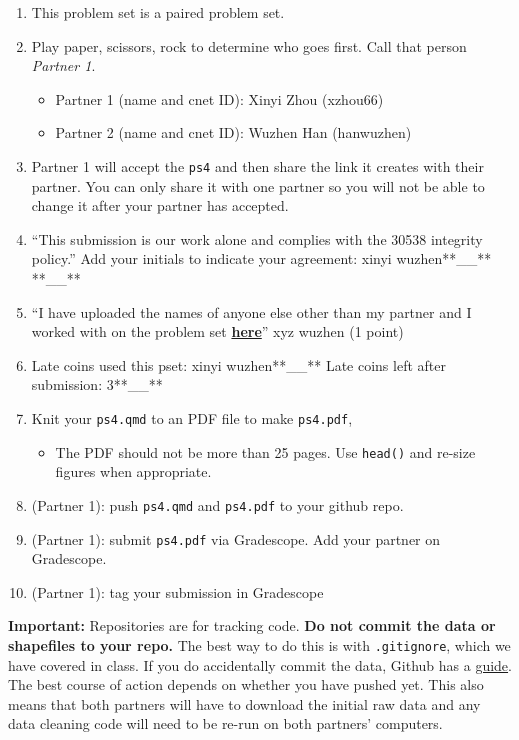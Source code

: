 \documentclass[
  letterpaper,
  DIV=11,
  numbers=noendperiod]{scrartcl}
\providecommand{\tightlist}{%
  \setlength{\itemsep}{0pt}\setlength{\parskip}{0pt}}\usepackage{longtable,booktabs,array}
\begin{document}
\begin{enumerate}
\def\labelenumi{\arabic{enumi}.}
\tightlist
\item
  This problem set is a paired problem set.
\item
  Play paper, scissors, rock to determine who goes first. Call that
  person \emph{Partner 1}.

  \begin{itemize}
  \tightlist
  \item
    Partner 1 (name and cnet ID): Xinyi Zhou (xzhou66)
  \item
    Partner 2 (name and cnet ID): Wuzhen Han (hanwuzhen)
  \end{itemize}
\item
  Partner 1 will accept the \texttt{ps4} and then share the link it
  creates with their partner. You can only share it with one partner so
  you will not be able to change it after your partner has accepted.
\item
  ``This submission is our work alone and complies with the 30538
  integrity policy.'' Add your initials to indicate your agreement:
  xinyi wuzhen**\_\_** **\_\_**
\item
  ``I have uploaded the names of anyone else other than my partner and I
  worked with on the problem set
  \textbf{\href{https://docs.google.com/forms/d/185usrCREQaUbvAXpWhChkjghdGgmAZXA3lPWpXLLsts/edit}{here}}''
  xyz wuzhen (1 point)
\item
  Late coins used this pset: xinyi wuzhen**\_\_** Late coins left after
  submission: 3**\_\_**
\item
  Knit your \texttt{ps4.qmd} to an PDF file to make \texttt{ps4.pdf},

  \begin{itemize}
  \tightlist
  \item
    The PDF should not be more than 25 pages. Use \texttt{head()} and
    re-size figures when appropriate.
  \end{itemize}
\item
  (Partner 1): push \texttt{ps4.qmd} and \texttt{ps4.pdf} to your github
  repo.
\item
  (Partner 1): submit \texttt{ps4.pdf} via Gradescope. Add your partner
  on Gradescope.
\item
  (Partner 1): tag your submission in Gradescope
\end{enumerate}

\textbf{Important:} Repositories are for tracking code. \textbf{Do not
commit the data or shapefiles to your repo.} The best way to do this is
with \texttt{.gitignore}, which we have covered in class. If you do
accidentally commit the data, Github has a
\href{https://docs.github.com/en/repositories/working-with-files/managing-large-files/about-large-files-on-github\#removing-files-from-a-repositorys-history}{guide}.
The best course of action depends on whether you have pushed yet. This
also means that both partners will have to download the initial raw data
and any data cleaning code will need to be re-run on both partners'
computers.
\end{document}
